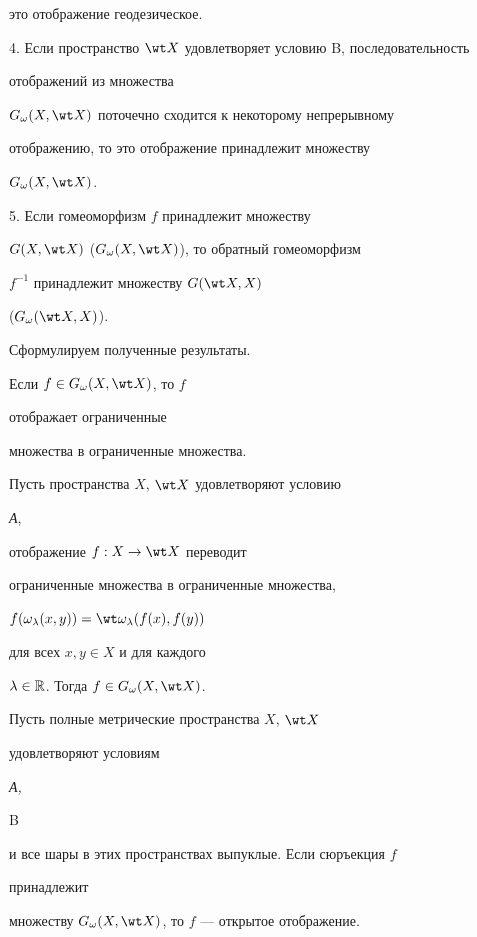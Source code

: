 это отображение геодезическое. 


 


4. Если пространство $\wt X$ удовлетворяет условию B, последовательность 


отображений из множества 


$G_{\omega}(X,\wt X)$ поточечно сходится к некоторому непрерывному 


отображению, то это отображение принадлежит множеству 


$G_{\omega}(X,\wt X)$. 


 


5. Если гомеоморфизм $f$ принадлежит множеству 


$G(X,\wt X)$ ($G_{\omega}(X,\wt X)$), то обратный гомеоморфизм 


$f^{-1}$ принадлежит множеству $G(\wt X,X)$ 


($G_{\omega}(\wt X,X)$). 


 


Сформулируем полученные результаты. 


 


\begin{thm} Если $f\in G_{\omega}(X,\wt X)$, то $f$ 


отображает ограниченные 


множества в ограниченные множества. 


\end{thm} 


 


\begin{thm} Пусть пространства $X$, $\wt X$ удовлетворяют условию 


{\em А}, 


отображение $f:X\to\wt X$ переводит 


ограниченные множества в ограниченные множества, 


$f(\omega_{\lambda}(x,y))=\wt\omega_{\lambda}(f(x),f(y))$ 


для всех $x,y\in X$ и для каждого 


$\lambda\in\Bbb R$. Тогда $f\in G_{\omega}(X,\wt X)$. 


\end{thm} 


 


\begin{thm} Пусть полные метрические пространства $X$, $\wt X$ 


удовлетворяют условиям {\em А, 


B} и все шары в этих пространствах выпуклые. Если сюръекция $f$ 


принадлежит 


множеству $G_{\omega}(X,\wt X)$, то $f$ --- открытое отображение. 


\end{thm} 


